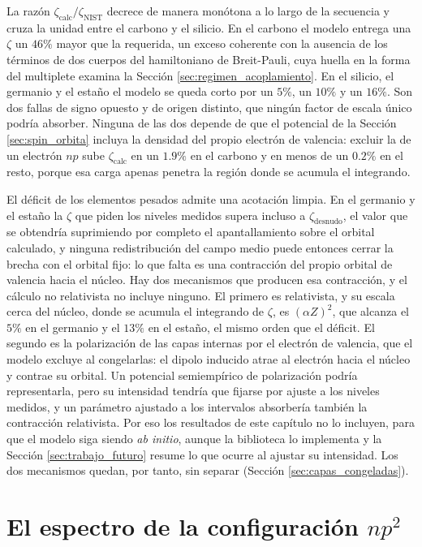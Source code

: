 La razón $\zeta_{\text{calc}}/\zeta_{\text{NIST}}$ decrece de manera monótona a lo largo de la secuencia y cruza la unidad entre el carbono y el silicio. En el carbono el modelo entrega una $\zeta$ un $46\%$ mayor que la requerida, un exceso coherente con la ausencia de los términos de dos cuerpos del hamiltoniano de Breit-Pauli, cuya huella en la forma del multiplete examina la Sección \ref{sec:regimen_acoplamiento}. En el silicio, el germanio y el estaño el modelo se queda corto por un $5\%$, un $10\%$ y un $16\%$. Son dos fallas de signo opuesto y de origen distinto, que ningún factor de escala único podría absorber. Ninguna de las dos depende de que el potencial de la Sección \ref{sec:spin_orbita} incluya la densidad del propio electrón de valencia: excluir la de un electrón $np$ sube $\zeta_{\text{calc}}$ en un $1.9\%$ en el carbono y en menos de un $0.2\%$ en el resto, porque esa carga apenas penetra la región donde se acumula el integrando.

El déficit de los elementos pesados admite una acotación limpia. En el germanio y el estaño la $\zeta$ que piden los niveles medidos supera incluso a $\zeta_{\text{desnudo}}$, el valor que se obtendría suprimiendo por completo el apantallamiento sobre el orbital calculado, y ninguna redistribución del campo medio puede entonces cerrar la brecha con el orbital fijo: lo que falta es una contracción del propio orbital de valencia hacia el núcleo. Hay dos mecanismos que producen esa contracción, y el cálculo no relativista no incluye ninguno. El primero es relativista, y su escala cerca del núcleo, donde se acumula el integrando de $\zeta$, es $(\alpha Z)^2$, que alcanza el $5\%$ en el germanio y el $13\%$ en el estaño, el mismo orden que el déficit. El segundo es la polarización de las capas internas por el electrón de valencia, que el modelo excluye al congelarlas: el dipolo inducido atrae al electrón hacia el núcleo y contrae su orbital. Un potencial semiempírico de polarización \parencite{Muller1984} podría representarla, pero su intensidad tendría que fijarse por ajuste a los niveles medidos, y un parámetro ajustado a los intervalos absorbería también la contracción relativista. Por eso los resultados de este capítulo no lo incluyen, para que el modelo siga siendo \textit{ab initio}, aunque la biblioteca lo implementa y la Sección \ref{sec:trabajo_futuro} resume lo que ocurre al ajustar su intensidad. Los dos mecanismos quedan, por tanto, sin separar (Sección \ref{sec:capas_congeladas}).

\section{El espectro de la configuración \texorpdfstring{$np^2$}{np2}}
\label{sec:espectro}

